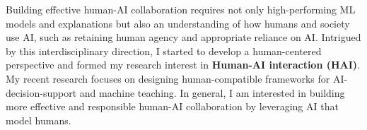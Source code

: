 




Building effective human-AI collaboration requires not only high-performing ML models and explanations but also an understanding of how humans and society use AI, such as retaining human agency and appropriate reliance on AI. Intrigued by this interdisciplinary direction, I started to develop a human-centered perspective and formed my research interest in \textbf{Human-AI interaction (HAI)}.
My recent research focuses on designing human-compatible frameworks for AI-decision-support and machine teaching.
In general, I am interested in building more effective and responsible human-AI collaboration by leveraging AI that model humans.







